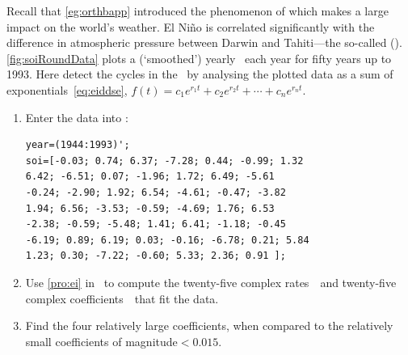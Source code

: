 \begin{reduce}
\begin{exercise}  
Recall that \autoref{eg:orthbapp} introduced the phenomenon of  which makes a large impact on the world's weather.
El Ni\~no is correlated significantly with the difference in atmospheric pressure between Darwin and Tahiti---the so-called  (\soi).
\autoref{fig:soiRoundData} plots a (`smoothed') yearly  \soi\ each year for fifty years up to 1993.
Here detect the cycles in the \soi\ by analysing the plotted data as a sum of exponentials~\eqref{eq:eiddse}, \(f(t)=c_1e^{r_1t}+c_2e^{r_2t}+\cdots+c_ne^{r_nt}\).
\begin{enumerate}
\item Enter the data into \script:
\setbox\ajrqrbox\hbox{}\marginajrbox%
\begin{verbatim}
year=(1944:1993)';
soi=[-0.03; 0.74; 6.37; -7.28; 0.44; -0.99; 1.32
6.42; -6.51; 0.07; -1.96; 1.72; 6.49; -5.61
-0.24; -2.90; 1.92; 6.54; -4.61; -0.47; -3.82
1.94; 6.56; -3.53; -0.59; -4.69; 1.76; 6.53
-2.38; -0.59; -5.48; 1.41; 6.41; -1.18; -0.45
-6.19; 0.89; 6.19; 0.03; -0.16; -6.78; 0.21; 5.84
1.23; 0.30; -7.22; -0.60; 5.33; 2.36; 0.91 ];
\end{verbatim}

\item Use \autoref{pro:ei} in \script\ to compute the twenty-five complex rates~\rv\ and twenty-five complex coefficients~\cv\ that fit the data.

\item Find the four relatively large coefficients, when compared to the relatively small coefficients of magnitude\({}<0.015\).


\end{enumerate}
\end{exercise}
\end{reduce}
